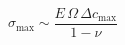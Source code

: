\documentclass[preview]{standalone}
\begin{document}
\[\sigma_\text{max} \sim \frac{E\,\Omega\,\Delta c_\text{max}}{1-\nu} \tag{7.6}\]
\end{document}
